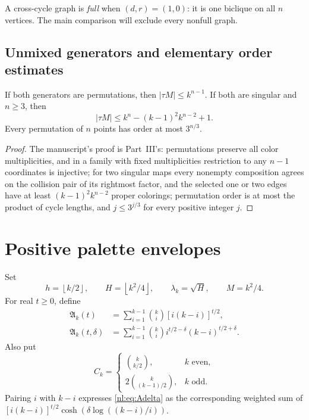 \documentclass[11pt,a4paper]{article}
\numberwithin{equation}{section}
\theoremstyle{definition}
\theoremstyle{remark}
\newcommand{\nlenv}{\mathfrak A}
\newcommand{\nlfloor}[1]{\left\lfloor #1\right\rfloor}
\begin{document}
A cross-cycle graph is \emph{full} when $(d,r)=(1,0)$: it is one biclique
on all $n$ vertices. The main comparison will exclude every nonfull graph.

\subsection{Unmixed generators and elementary order estimates}
\begin{lemma}\label{nl:lem:unmixed}
If both generators are permutations, then $|\tau M|\le k^{n-1}$.
If both are singular and $n\ge3$, then
\[
 |\tau M|\le k^n-(k-1)^2k^{n-2}+1.
\]
Every permutation of $n$ points has order at most $3^{n/3}$.
\end{lemma}
\begin{proof}
The manuscript's proof is Part~III's: permutations preserve all color
multiplicities, and in a family with fixed multiplicities restriction to
any $n-1$ coordinates is injective; for two singular maps every nonempty
composition agrees on the collision pair of its rightmost factor, and the
selected one or two edges have at least $(k-1)^2k^{n-2}$ proper colorings;
permutation order is at most the product of cycle lengths, and
$j\le3^{j/3}$ for every positive integer $j$.
\end{proof}

\section{Positive palette envelopes}\label{nl:sec:envelope}

Set
\begin{equation}\label{nl:eq:constants}
 h=\nlfloor{k/2},\qquad H=\nlfloor{k^2/4},\qquad
 \lambda_k=\sqrt H,\qquad M=k^2/4.
\end{equation}
For real $t\ge0$, define
\begin{align}
 \nlenv_k(t)&=\sum_{i=1}^{k-1}\binom ki [i(k-i)]^{t/2},\label{nl:eq:A}\\
 \nlenv_k(t,\delta)&=\sum_{i=1}^{k-1}\binom ki
           i^{t/2-\delta}(k-i)^{t/2+\delta}.
 \label{nl:eq:Adelta}
\end{align}
Also put
\[
 C_k=\begin{cases}\binom{k}{k/2},&k\text{ even},\\
                  2\binom{k}{(k-1)/2},&k\text{ odd}.
       \end{cases}
\]
Pairing $i$ with $k-i$ expresses \eqref{nl:eq:Adelta} as the corresponding
weighted sum of
$[i(k-i)]^{t/2}\cosh(\delta\log((k-i)/i))$.
\end{document}
